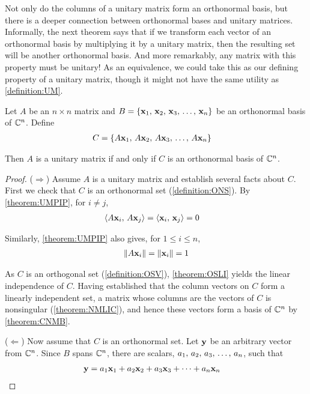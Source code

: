 \documentclass{ximera}
\begin{document}
Not only do the columns of a unitary matrix form an orthonormal basis,
but there is a deeper connection between orthonormal bases and unitary
matrices.  Informally, the next theorem says that if we transform each
vector of an orthonormal basis by multiplying it by a unitary matrix,
then the resulting set will be another orthonormal basis.  And more
remarkably, any matrix with this property must be unitary!  As an
equivalence, we could take this as our defining property of a unitary
matrix, though it might not have the same utility as
\ref{definition:UM}.

\begin{theorem}
  \label{theorem:UMCOB}

  Let $A$ be an $n\times n$ matrix and $B=\left\{\mathbf{x}_{1},\,\mathbf{x}_{2},\,\mathbf{x}_{3},\,\ldots,\,\mathbf{x}_{n}\right\}$ be an orthonormal basis of $\mathbb{C}^{n}$.  Define
  \begin{align*}
    C&=\left\{A\mathbf{x}_1,\,A\mathbf{x}_2,\,A\mathbf{x}_3,\,\dots,\,A\mathbf{x}_n\right\}
  \end{align*}

  Then $A$ is a unitary matrix if and only if $C$ is an orthonormal basis of $\mathbb{C}^{n}$.

  \begin{proof}
    ($\Rightarrow$)
    Assume $A$ is a unitary matrix and establish several facts about $C$.  First we check that $C$ is an orthonormal set (\ref{definition:ONS}).  By \ref{theorem:UMPIP}, for $i\neq j$,
    \begin{align*}
      \left\langle A\mathbf{x}_i,\,A\mathbf{x}_j\right\rangle&
                                               =\left\langle\mathbf{x}_i,\,\mathbf{x}_j\right\rangle=0
    \end{align*}
    
    Similarly, \ref{theorem:UMPIP} also gives, for $1\leq i\leq n$,
    \begin{align*}
      \left\lVert A\mathbf{x}_i\right\rVert=\left\lVert\mathbf{x}_i\right\rVert=1
    \end{align*}

    As $C$ is an orthogonal set (\ref{definition:OSV}),
    \ref{theorem:OSLI} yields the linear independence of $C$.  Having
    established that the column vectors on $C$ form a linearly
    independent set, a matrix whose columns are the vectors of $C$ is
    nonsingular (\ref{theorem:NMLIC}), and hence these vectors form a
    basis of $\mathbb{C}^{n}$ by \ref{theorem:CNMB}.

    ($\Leftarrow$)
    Now assume that $C$ is an orthonormal set.  Let $\mathbf{y}$ be an arbitrary vector from $\mathbb{C}^{n}$.  Since $B$ spans $\mathbb{C}^{n}$, there are scalars, ${a}_{1},\,{a}_{2},\,{a}_{3},\,\ldots,\,{a}_{n}$, such that
    \begin{align*}
      \mathbf{y}&=a_1\mathbf{x}_1+a_2\mathbf{x}_2+a_3\mathbf{x}_3+\cdots+a_n\mathbf{x}_n
    \end{align*}


\end{proof}
\end{theorem}
\end{document}
